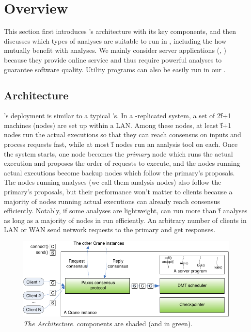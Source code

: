 \section{\xxx Overview} \label{sec:overview}

This section first introduces \xxx's architecture with its key components, and 
then discusses which types of analyses are suitable to run in \xxx, including 
the how \xxx mutually benefit with analyses. We mainly consider server 
applications (\eg, \clamav) because they provide online service and thus 
require powerful analyses to guarantee software quality. Utility programs 
can also be easily run in our \xxx.

\subsection{Architecture} \label{sec:arch}

\xxx's deployment is similar to a typical \smr's. In a \xxx-replicated
system, a set of 2\v{f}+1 machines (nodes) are set up within a LAN. Among these 
nodes, at least \v{f}+1 nodes run the actual executions so that 
they can reach consensus on inputs and process requests fast, while at most 
\v{f} nodes run an analysis tool on each. Once the \xxx system starts, 
one node becomes the \emph{primary} node which runs the actual execution and 
proposes the order of requests to execute, and the nodes running actual 
executions become backup nodes which follow the primary's proposals. The nodes 
running analyses (we call them analysis nodes) also follow the primary's 
proposals, but their performance won't matter to clients because a majority of 
nodes running actual executions can already reach consensus efficiently. 
Notably, if some analyses are lightweight, \xxx can run more than \v{f} 
analyses as long as a majority of nodes in \xxx run efficiently. An arbitrary 
number of clients in LAN or WAN send network requests to the primary and get 
responses. 


\begin{figure}[t]
\vspace{.20in}
\centering
\includegraphics[width=.5\textwidth]{figures/arch}
\vspace{-.20in}
\caption{{\em The \xxx Architecture.} \xxx components are shaded (and in
  green).} \label{fig:arch}
\vspace{-.05in}
\end{figure}

